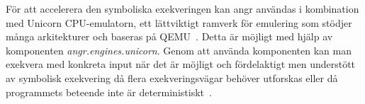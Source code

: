 För att accelerera den symboliska exekveringen kan angr användas i kombination
med Unicorn CPU-emulatorn, ett lättviktigt ramverk för emulering som stödjer
många arkitekturer och baseras på QEMU~\cite{UnicornEngine}. Detta är möjligt
med hjälp av komponenten \emph{angr.engines.unicorn}. Genom att använda
komponenten kan man exekvera med konkreta input när det är möjligt och
fördelaktigt men understött av symbolisk exekvering då flera exekveringsvägar
behöver utforskas eller då programmets beteende inte är
deterministiskt~\cite{angr_uni}.

